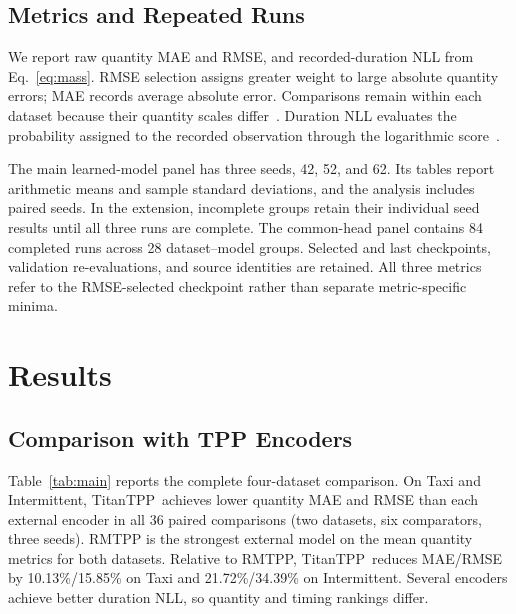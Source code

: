 \documentclass[runningheads]{llncs}
\newcommand{\method}{TitanTPP}
\begin{document}
\subsection{Metrics and Repeated Runs}
We report raw quantity MAE and RMSE, and recorded-duration NLL from
Eq.~\eqref{eq:mass}. RMSE selection assigns greater weight to large absolute
quantity errors; MAE records average absolute error. Comparisons remain
within each dataset because their quantity scales differ~\cite{hyndman2006accuracy}.
Duration NLL evaluates the probability assigned to the recorded observation
through the logarithmic score~\cite{gneiting2007proper}.

The main learned-model panel has three seeds, 42, 52, and 62. Its tables report
arithmetic means and sample standard deviations, and the analysis includes
paired seeds. In the extension, incomplete groups retain their individual
seed results until all three runs are complete.
The common-head panel contains 84 completed runs across 28 dataset--model
groups. Selected and last checkpoints, validation re-evaluations, and source
identities are retained. All three metrics refer to the RMSE-selected
checkpoint rather than separate metric-specific minima.

\section{Results}
\subsection{Comparison with TPP Encoders}
Table~\ref{tab:main} reports the complete four-dataset comparison. On Taxi
and Intermittent, \method\ achieves lower quantity MAE and RMSE than each
external encoder in all 36 paired comparisons (two datasets, six comparators,
three seeds). RMTPP is the strongest external model on the mean quantity
metrics for both datasets. Relative to RMTPP, \method\ reduces MAE/RMSE by
10.13\%/15.85\% on Taxi and 21.72\%/34.39\% on Intermittent. Several encoders
achieve better duration NLL, so quantity and timing rankings differ.
\end{document}
